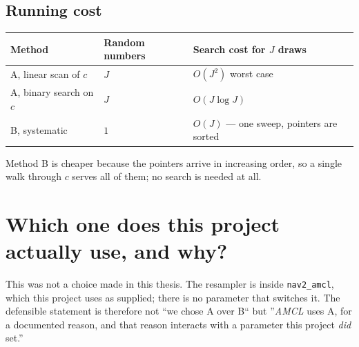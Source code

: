 \documentclass[11pt,a4paper]{report}
\newcommand{\file}[1]{\texttt{\small #1}}
\begin{document}
\subsection{Running cost}

\begin{center}
\begin{tabular}{@{}lll@{}}
\toprule
\textbf{Method} & \textbf{Random numbers} & \textbf{Search cost for $J$ draws} \\
\midrule
A, linear scan of $c$   & $J$ & $O(J^2)$ worst case \\
A, binary search on $c$ & $J$ & $O(J \log J)$ \\
B, systematic           & $1$ & $O(J)$ --- one sweep, pointers are sorted \\
\bottomrule
\end{tabular}
\end{center}

Method B is cheaper because the pointers arrive in increasing order, so a
single walk through $c$ serves all of them; no search is needed at all.

\section{Which one does this project actually use, and why?}
\label{sec:whichresampler}

\begin{warnbox}
This was not a choice made in this thesis. The resampler is inside
\file{nav2\_amcl}, which this project uses as supplied; there is no parameter
that switches it. The defensible statement is therefore not ``we chose A over
B`` but ''\emph{AMCL} uses A, for a documented reason, and that reason interacts
with a parameter this project \emph{did} set.''
\end{warnbox}
\end{document}
